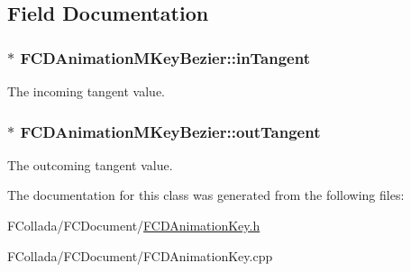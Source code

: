 \subsection{Field Documentation}
\hypertarget{classFCDAnimationMKeyBezier_aaf6f55f43516c1bf38cef19ecbb8fe21}{
\subsubsection[{inTangent}]{$\ast$ {\bf FCDAnimationMKeyBezier::inTangent}}}
\label{classFCDAnimationMKeyBezier_aaf6f55f43516c1bf38cef19ecbb8fe21}
The incoming tangent value. \hypertarget{classFCDAnimationMKeyBezier_aea9338c2e0d894e9d5e9a4dcf00928e6}{
\subsubsection[{outTangent}]{$\ast$ {\bf FCDAnimationMKeyBezier::outTangent}}}
\label{classFCDAnimationMKeyBezier_aea9338c2e0d894e9d5e9a4dcf00928e6}
The outcoming tangent value. 

The documentation for this class was generated from the following files:\begin{DoxyCompactItemize}
\item 
FCollada/FCDocument/\hyperlink{FCDAnimationKey_8h}{FCDAnimationKey.h}\item 
FCollada/FCDocument/FCDAnimationKey.cpp\end{DoxyCompactItemize}

